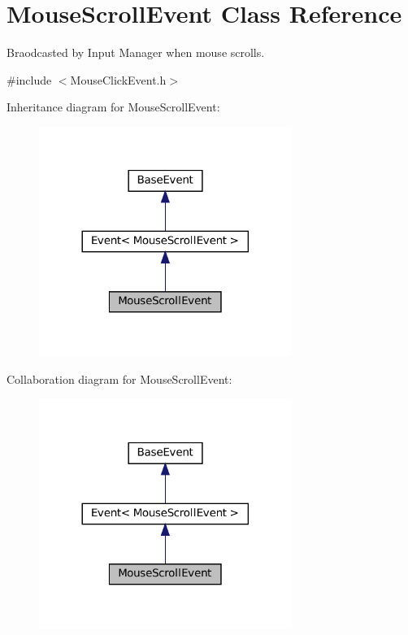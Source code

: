 \hypertarget{classMouseScrollEvent}{}\section{Mouse\+Scroll\+Event Class Reference}
\label{classMouseScrollEvent}


Braodcasted by Input Manager when mouse scrolls.  




{\ttfamily \#include $<$Mouse\+Click\+Event.\+h$>$}



Inheritance diagram for Mouse\+Scroll\+Event\+:
\nopagebreak
\begin{figure}[H]
\begin{center}
\leavevmode
\includegraphics[width=233pt]{classMouseScrollEvent__inherit__graph}
\end{center}
\end{figure}


Collaboration diagram for Mouse\+Scroll\+Event\+:
\nopagebreak
\begin{figure}[H]
\begin{center}
\leavevmode
\includegraphics[width=233pt]{classMouseScrollEvent__coll__graph}
\end{center}
\end{figure}
